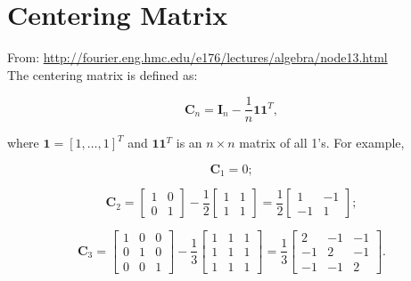 \documentclass[10pt,b5paper,titlepage]{book}
\begin{document}
\chapter{Centering Matrix}

From: \url{http://fourier.eng.hmc.edu/e176/lectures/algebra/node13.html} \\

The centering matrix is defined as:

\begin{equation}
    \mathbf{C}_{n} = \mathbf{I}_{n} - \frac{1}{n}\mathbf{1}\mathbf{1}^{T}
,\end{equation}

where $\mathbf{1} = [1, \ldots , 1]^{T}$ and $\mathbf{1}\mathbf{1}^{T}$
is an $n \times n$ matrix of all 1's. For example,

\begin{equation}
    \mathbf{C}_{1} = 0
;\end{equation}

\begin{equation}
    \mathbf{C}_{2} =
    \begin{bmatrix}
        1 & 0 \\
        0 & 1
    \end{bmatrix}
    - \frac{1}{2}
    \begin{bmatrix}
        1 & 1 \\
        1 & 1
    \end{bmatrix}
    = \frac{1}{2}\begin{bmatrix}
         1 & -1 \\
        -1 &  1
    \end{bmatrix}
;\end{equation}

\begin{equation}
    \mathbf{C}_{3} = \begin{bmatrix}
        1 & 0 & 0 \\
        0 & 1 & 0 \\
        0 & 0 & 1
    \end{bmatrix}
    - \frac{1}{3} \begin{bmatrix}
        1 & 1 & 1 \\
        1 & 1 & 1 \\
        1 & 1 & 1
    \end{bmatrix}
    = \frac{1}{3} \begin{bmatrix}
        2 & -1 & -1 \\
        -1 & 2 & -1 \\
        -1 & -1 & 2
    \end{bmatrix}
.\end{equation}
\end{document}
